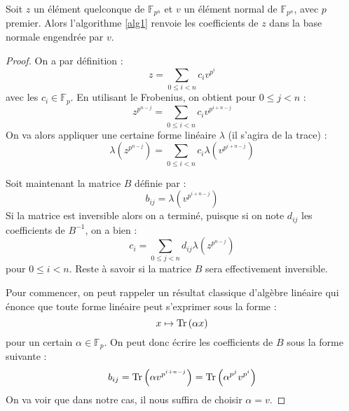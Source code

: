 \documentclass[a4paper]{article} %
\numberwithin{equation}{section}
\newcommand\GF[1]{\mathbb{F}_{#1}}
\newcommand\Tr[1]{\textup{Tr}\left(#1\right)}
\begin{document}
\begin{prop}
Soit $z$ un élément quelconque de $\GF{p^n}$ et $v$ un élément normal de $\GF{p^n}$, avec $p$ premier. Alors l'algorithme \ref{alg1} renvoie les coefficients de $z$ dans la base normale engendrée par $v$.
\end{prop}
\begin{proof}
On a par définition :
\[z = \sum_{0 \leq i < n}{c_iv^{p^i}}\]
avec les $c_i\in\GF{p}$. En utilisant le Frobenius, on obtient pour $0\leq j < n$ :
\[z^{p^{n-j}} = \sum_{0\leq i < n}{c_iv^{p^{i+n-j}}}\]
On va alors appliquer une certaine forme linéaire $\lambda$ (il s'agira de la trace) :
\[\lambda\left(z^{p^{n-j}}\right) = \sum_{0\leq i < n}{c_i\lambda\left(v^{p^{i+n-j}}\right)}\]\par
Soit maintenant la matrice $B$ définie par :
\[b_{ij} = \lambda\left(v^{p^{i+n-j}}\right)\]
Si la matrice est inversible alors on a terminé, puisque si on note $d_{ij}$ les coefficients de $B^{-1}$, on a bien :
\[c_i = \sum_{0\leq j < n}{d_{ij}\lambda\left(z^{p^{n-j}}\right)}\]
pour $0\leq i < n$. Reste à savoir si la matrice $B$ sera effectivement inversible.\par
Pour commencer, on peut rappeler un résultat classique d'algèbre linéaire qui énonce que toute forme linéaire peut s'exprimer sous la forme :%
\[x \mapsto \Tr{\alpha x}\]
pour un certain $\alpha\in\GF{p}$. On peut donc écrire les coefficients de $B$ sous la forme suivante :
\[b_{ij} = \Tr{\alpha v^{p^{i+n-j}}} = \Tr{\alpha^{p^j}v^{p^i}}\]
On va voir que dans notre cas, il nous suffira de choisir $\alpha = v$.


\end{proof}
\end{document}
